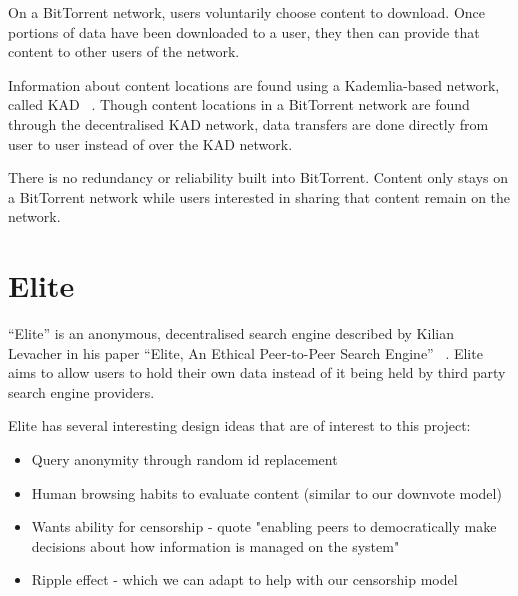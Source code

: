 On a BitTorrent network, users voluntarily choose content to download. Once portions of data have been
downloaded to a user, they then can provide that content to other users of the network.

Information about content locations are found using a Kademlia-based network, called KAD ~\cite{torrentkad}. Though
content locations in a BitTorrent network are found through the decentralised KAD network,
data transfers are done directly from user to user instead of over the KAD network.

There is no redundancy or reliability built into BitTorrent. Content only stays on a BitTorrent network while
users interested in sharing that content remain on the network.

\section{Elite}

“Elite” is an anonymous, decentralised search engine described by Kilian Levacher in his paper
“Elite, An Ethical Peer-to-Peer Search Engine” ~\cite{levacher}. Elite aims to allow users to hold their own data
instead of it being held by third party search engine providers.

Elite has several interesting design ideas that are of interest to this project:
\begin{itemize}
    \item{Query anonymity through random id replacement}
    \item Human browsing habits to evaluate content (similar to our downvote model)
    \item Wants ability for censorship - quote "enabling peers to democratically make decisions about how information is managed on the system"
    \item Ripple effect - which we can adapt to help with our censorship model
\end{itemize}
